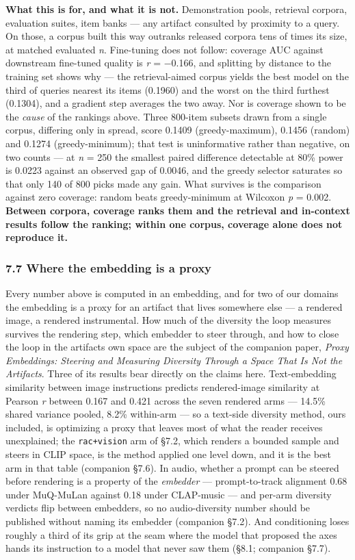 \documentclass[
  10pt,
]{article}
\theoremstyle{plain}
\theoremstyle{definition}
\begin{document}
\textbf{What this is for, and what it is not.} Demonstration pools,
retrieval corpora, evaluation suites, item banks --- any artifact
consulted by proximity to a query. On those, a corpus built this way
outranks released corpora tens of times its size, at matched evaluated
\emph{n}. Fine-tuning does not follow: coverage AUC against downstream
fine-tuned quality is \emph{r} = −0.166, and splitting by distance to
the training set shows why --- the retrieval-aimed corpus yields the
best model on the third of queries nearest its items (0.1960) and the
worst on the third furthest (0.1304), and a gradient step averages the
two away. Nor is coverage shown to be the \emph{cause} of the rankings
above. Three 800-item subsets drawn from a single corpus, differing only
in spread, score 0.1409 (greedy-maximum), 0.1456 (random) and 0.1274
(greedy-minimum); that test is uninformative rather than negative, on
two counts --- at \emph{n} = 250 the smallest paired difference
detectable at 80\% power is 0.0223 against an observed gap of 0.0046,
and the greedy selector saturates so that only 140 of 800 picks made any
gain. What survives is the comparison against zero coverage: random
beats greedy-minimum at Wilcoxon \emph{p} = 0.002. \textbf{Between
corpora, coverage ranks them and the retrieval and in-context results
follow the ranking; within one corpus, coverage alone does not reproduce
it.}

\subsubsection{7.7 Where the embedding is a
proxy}\label{77-where-the-embedding-is-a-proxy}

Every number above is computed in an embedding, and for two of our
domains the embedding is a proxy for an artifact that lives somewhere
else --- a rendered image, a rendered instrumental. How much of the
diversity the loop measures survives the rendering step, which embedder
to steer through, and how to close the loop in the
artifact\textquotesingle s own space are the subject of the companion
paper, \emph{Proxy Embeddings: Steering and Measuring Diversity Through
a Space That Is Not the Artifact\textquotesingle s}. Three of its
results bear directly on the claims here. Text-embedding similarity
between image instructions predicts rendered-image similarity at Pearson
\emph{r} between 0.167 and 0.421 across the seven rendered arms ---
14.5\% shared variance pooled, 8.2\% within-arm --- so a text-side
diversity method, ours included, is optimizing a proxy that leaves most
of what the reader receives unexplained; the \texttt{rac+vision} arm of
§7.2, which renders a bounded sample and steers in CLIP space, is the
method applied one level down, and it is the best arm in that table
(companion §7.6). In audio, whether a prompt can be steered before
rendering is a property of the \emph{embedder} --- prompt-to-track
alignment 0.68 under MuQ-MuLan against 0.18 under CLAP-music --- and
per-arm diversity verdicts flip between embedders, so no audio-diversity
number should be published without naming its embedder (companion §7.2).
And conditioning loses roughly a third of its grip at the seam where the
model that proposed the axes hands its instruction to a model that never
saw them (§8.1; companion §7.7).
\end{document}
